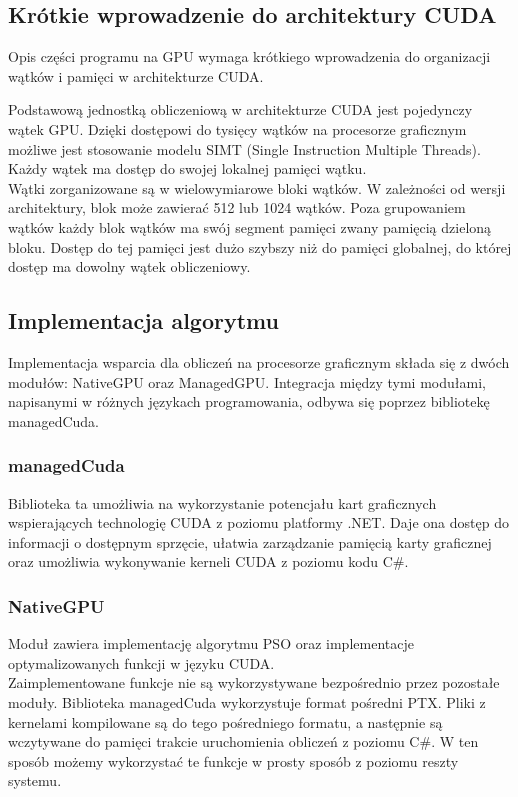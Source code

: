\documentclass[12pt, twoside, openany, abstract=on]{report}
\theoremstyle{definition}
\begin{document}
\subsection{Krótkie wprowadzenie do architektury CUDA}
Opis części programu na GPU wymaga krótkiego wprowadzenia do organizacji wątków i pamięci w architekturze CUDA.

Podstawową jednostką obliczeniową 
w architekturze CUDA jest pojedynczy wątek GPU. Dzięki dostępowi do tysięcy wątków na procesorze graficznym możliwe jest stosowanie modelu SIMT (Single Instruction Multiple Threads). Każdy wątek ma dostęp do swojej lokalnej pamięci wątku. \\
Wątki zorganizowane są w wielowymiarowe bloki wątków. W zależności od wersji architektury, blok może zawierać 512 lub 1024 wątków. Poza grupowaniem wątków każdy blok wątków ma swój segment pamięci zwany pamięcią dzieloną bloku. Dostęp do tej pamięci jest dużo szybszy niż do pamięci globalnej, do której dostęp ma dowolny wątek obliczeniowy. \cite{CudaProgGuide}

\subsection{Implementacja algorytmu}
Implementacja wsparcia dla obliczeń na procesorze graficznym składa się z dwóch modułów: NativeGPU oraz ManagedGPU. Integracja między tymi modułami, napisanymi w różnych językach programowania, odbywa się poprzez bibliotekę managedCuda.

\subsubsection{managedCuda}
Biblioteka ta umożliwia na wykorzystanie potencjału kart graficznych wspierających technologię CUDA z poziomu platformy .NET. Daje ona dostęp do informacji o dostępnym sprzęcie, ułatwia zarządzanie pamięcią karty graficznej oraz umożliwia wykonywanie kerneli CUDA z poziomu kodu C\#. 

\subsubsection{NativeGPU}
Moduł zawiera implementację algorytmu PSO oraz implementacje optymalizowanych funkcji w języku CUDA. \\

Zaimplementowane funkcje nie są wykorzystywane bezpośrednio przez pozostałe moduły. Biblioteka managedCuda wykorzystuje format pośredni PTX. Pliki z kernelami kompilowane są do tego pośredniego formatu, a następnie są wczytywane do pamięci trakcie uruchomienia obliczeń z poziomu C\#. W ten sposób możemy wykorzystać te funkcje w prosty sposób z poziomu reszty systemu. \\
\end{document}
